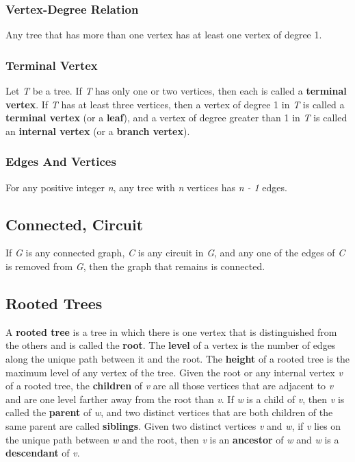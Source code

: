 \documentclass{article}
\begin{document}
\subsubsection{Vertex-Degree Relation}
Any tree that has more than one vertex has at least one vertex of degree 1.

\subsubsection{Terminal Vertex}
Let \textit{T} be a tree. If \textit{T} has only one or two vertices, then each is called a \textbf{terminal vertex}. If \textit{T} has at least three vertices, then a vertex of degree 1 in \textit{T} is called a \textbf{terminal vertex} (or a \textbf{leaf}), and a vertex of degree greater than 1 in \textit{T} is called an \textbf{internal vertex} (or a \textbf{branch vertex}).

\subsubsection{Edges And Vertices}
For any positive integer \textit{n}, any tree with \textit{n} vertices has \textit{n - 1} edges.

\subsection{Connected, Circuit}
If \textit{G} is any connected graph, \textit{C} is any circuit in \textit{G}, and any one of the edges of \textit{C} is removed from \textit{G}, then the graph that remains is connected.


\setcounter{section}{10}
\setcounter{subsection}{5}

\subsection{Rooted Trees}
A \textbf{rooted tree} is a tree in which there is one vertex that is distinguished from the others and is called the \textbf{root}. The \textbf{level} of a vertex is the number of edges along the unique path between it and the root. The \textbf{height} of a rooted tree is the maximum level of any vertex of the tree. Given the root or any internal vertex \textit{v} of a rooted tree, the \textbf{children} of \textit{v} are all those vertices that are adjacent to \textit{v} and are one level farther away from the root than \textit{v}. If \textit{w} is a child of \textit{v}, then \textit{v} is called the \textbf{parent} of \textit{w}, and two distinct vertices that are both children of the same parent are called \textbf{siblings}. Given two distinct vertices \textit{v} and \textit{w}, if \textit{v} lies on the unique path between \textit{w} and the root, then \textit{v} is an \textbf{ancestor} of \textit{w} and \textit{w} is a \textbf{descendant} of \textit{v}.
\end{document}
